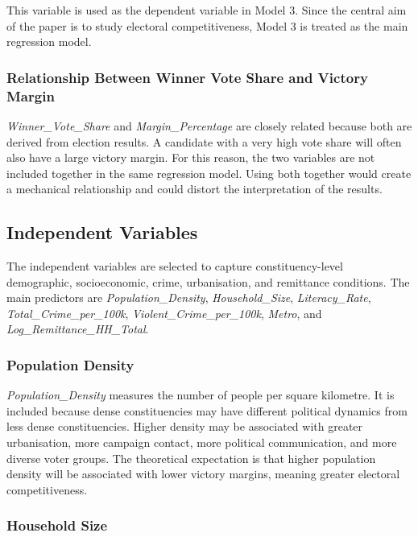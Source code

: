 \documentclass[12pt,a4paper]{article}
\begin{document}
This variable is used as the dependent variable in Model 3. Since the central aim of the paper is to study electoral competitiveness, Model 3 is treated as the main regression model.

\subsubsection{Relationship Between Winner Vote Share and Victory Margin}

\textit{Winner\_Vote\_Share} and \textit{Margin\_Percentage} are closely related because both are derived from election results. A candidate with a very high vote share will often also have a large victory margin. For this reason, the two variables are not included together in the same regression model. Using both together would create a mechanical relationship and could distort the interpretation of the results.

\subsection{Independent Variables}

The independent variables are selected to capture constituency-level demographic, socioeconomic, crime, urbanisation, and remittance conditions. The main predictors are \textit{Population\_Density}, \textit{Household\_Size}, \textit{Literacy\_Rate}, \textit{Total\_Crime\_per\_100k}, \textit{Violent\_Crime\_per\_100k}, \textit{Metro}, and \textit{Log\_Remittance\_HH\_Total}.

\subsubsection{Population Density}

\textit{Population\_Density} measures the number of people per square kilometre. It is included because dense constituencies may have different political dynamics from less dense constituencies. Higher density may be associated with greater urbanisation, more campaign contact, more political communication, and more diverse voter groups. The theoretical expectation is that higher population density will be associated with lower victory margins, meaning greater electoral competitiveness.

\subsubsection{Household Size}
\end{document}
